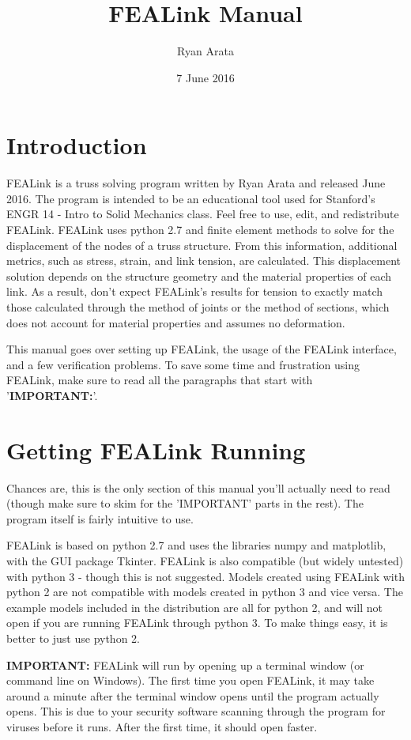 \documentclass[11pt, oneside]{article}   	%
\title{FEALink Manual}
\author{Ryan Arata}
\date{7 June 2016}							%
\begin{document}
\maketitle
\tableofcontents

\section{Introduction}
FEALink is a truss solving program written by Ryan Arata and released June 2016.  The program is intended to be an educational tool used for Stanford's ENGR 14 - Intro to Solid Mechanics class.  Feel free to use, edit, and redistribute FEALink.  FEALink uses python 2.7 and finite element methods to solve for the displacement of the nodes of a truss structure.  From this information, additional metrics, such as stress, strain, and link tension, are calculated.  This displacement solution depends on the structure geometry and the material properties of each link.  As a result, don't expect FEALink's results for tension to exactly match those calculated through the method of joints or the method of sections, which does not account for material properties and assumes no deformation.

This manual goes over setting up FEALink, the usage of the FEALink interface, and a few verification problems.  To save some time and frustration using FEALink, make sure to read all the paragraphs that start with '\textbf{IMPORTANT:}'.  


\section{Getting FEALink Running}
Chances are, this is the only section of this manual you'll actually need to read (though make sure to skim for the 'IMPORTANT' parts in the rest).  The program itself is fairly intuitive to use.

FEALink is based on python 2.7 and uses the libraries numpy and matplotlib, with the GUI package Tkinter.  FEALink is also compatible (but widely untested) with python 3 - though this is not suggested.  Models created using FEALink with python 2 are not compatible with models created in python 3 and vice versa.  The example models included in the distribution are all for python 2, and will not open if you are running FEALink through python 3.  To make things easy, it is better to just use python 2.  

\textbf{IMPORTANT:} FEALink will run by opening up a terminal window (or command line on Windows).  The first time you open FEALink, it may take around a minute after the terminal window opens until the program actually opens.  This is due to your security software scanning through the program for viruses before it runs.  After the first time, it should open faster.
\end{document}
